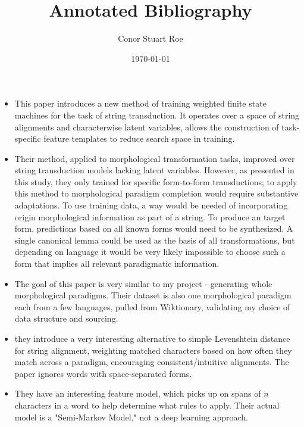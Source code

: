 \documentclass[12pt]{report}
\title{Annotated Bibliography}
\author{Conor Stuart Roe}
\date{\today}
\begin{document}
\maketitle
\thispagestyle{headings}


\begin{itemize}
	
	\item This paper introduces a new method of training weighted finite state machines for the task of string transduction. It operates over a space of string alignments and characterwise latent variables, allows the construction of task-specific feature templates to reduce search space in training. 
	
	\item Their method, applied to morphological transformation tasks, improved over string transduction models lacking latent variables. However, as presented in this study, they only trained for specific form-to-form transductions; to apply this method to morphological paradigm completion would require substantive adaptations. To use training data, a way would be needed of incorporating origin morphological information as part of a string. To produce an target form, predictions based on all known forms would need to be synthesized. A single canonical lemma could be used as the basis of all transformations, but depending on language it would be very likely impossible to choose such a form that implies all relevant paradigmatic information.
	
\end{itemize}


\begin{itemize}
	
	\item The goal of this paper is very similar to my project - generating whole morphological paradigms. Their dataset is also one morphological paradigm each from a few languages, pulled from Wiktionary, validating my choice of data structure and sourcing.
	
	\item they introduce a very interesting alternative to simple Levenshtein distance for string alignment, weighting matched characters based on how often they match across a paradigm, encouraging consistent/intuitive alignments. The paper ignores words with space-separated forms.
	
	\item They have an interesting feature model, which picks up on spans of $n$ characters in a word to help determine what rules to apply. Their actual model is a "Semi-Markov Model," not a deep learning approach. 
	
\end{itemize}
\end{document}

